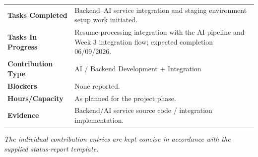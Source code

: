 \documentclass[11pt,a4paper]{article}
\begin{document}
\vspace{4pt}
\begin{tabular}{>{\bfseries}p{} p{}}
\toprule
Tasks Completed & Backend--AI service integration and staging environment setup work initiated. \\
Tasks In Progress & Resume-processing integration with the AI pipeline and Week 3 integration flow; expected completion 06/09/2026. \\
Contribution Type & AI / Backend Development + Integration \\
Blockers & None reported. \\
Hours/Capacity & As planned for the project phase. \\
Evidence & Backend/AI service source code / integration implementation. \\
\bottomrule
\end{tabular}

\vspace{10pt}
\textit{The individual contribution entries are kept concise in accordance with the supplied status-report template.}
\end{document}
